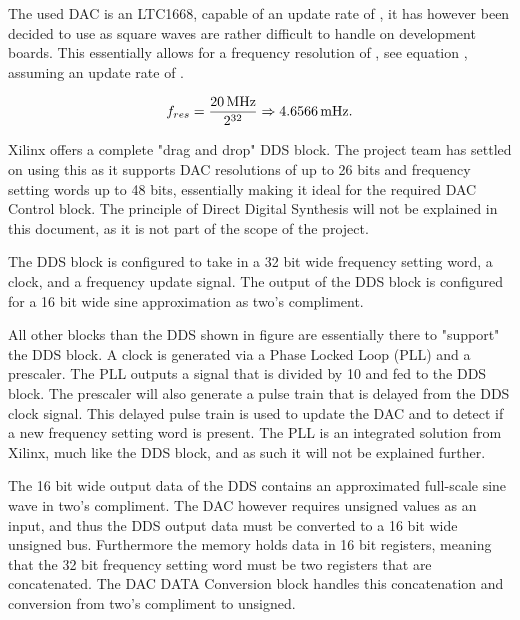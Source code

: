 The used DAC is an LTC1668, capable of an update rate of , it has however been decided to use  as  square waves are rather difficult to handle on development boards. This essentially allows for a frequency resolution of , see equation , assuming an update rate of .

\begin{equation}
    \label{eq:7_2_3_resolution}
    f_{res} = \frac{\SI{20}{\mega\hertz}}{2^{32}} \Rightarrow \SI{4.6566}{\milli\hertz}. 
\end{equation}

Xilinx offers a complete "drag and drop" DDS block. The project team has settled on using this as it supports DAC resolutions of up to 26 bits and frequency setting words up to 48 bits, essentially making it ideal for the required DAC Control block. The principle of Direct Digital Synthesis will not be explained in this document, as it is not part of the scope of the project.

The DDS block is configured to take in a 32 bit wide frequency setting word, a  clock, and a frequency update signal. The output of the DDS block is configured for a 16 bit wide sine approximation as two's compliment.

All other blocks than the DDS shown in figure  are essentially there to "support" the DDS block. A  clock is generated via a Phase Locked Loop (PLL) and a prescaler. The PLL outputs a  signal that is divided by 10 and fed to the DDS block. The prescaler will also generate a  pulse train that is delayed from the DDS clock signal. This delayed pulse train is used to update the DAC and to detect if a new frequency setting word is present. The PLL is an integrated solution from Xilinx, much like the DDS block, and as such it will not be explained further.

The 16 bit wide output data of the DDS contains an approximated full-scale sine wave in two's compliment. The DAC however requires unsigned values as an input, and thus the DDS output data must be converted to a 16 bit wide unsigned bus. Furthermore the memory holds data in 16 bit registers, meaning that the 32 bit frequency setting word must be two registers that are concatenated. The DAC DATA Conversion block handles this concatenation and conversion from two's compliment to unsigned.

